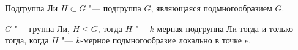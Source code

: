 	\begin{definition} Подгруппа Ли $H\subset G$ "--- подгруппа $G$, являющаяся подмногообразием $G$. \end{definition}
	
	\begin{lemma} $G$ "--- группа Ли, $H\leq G$, тогда $H$ "--- $k$-мерная подгруппа Ли тогда и только тогда, когда $H$ "--- $k$-мерное подмногообразие локально в точке $e$. \end{lemma}
	

